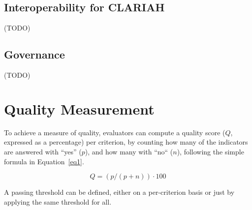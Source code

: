 \documentclass[a4paper,11pt]{article}
\begin{document}
\subsection{Interoperability for CLARIAH}

(TODO)

\subsection{Governance}

(TODO)

\section{Quality Measurement}

To achieve a measure of quality, evaluators can compute a quality score ($Q$,
expressed as a percentage) per criterion, by counting how many of the
indicators are answered with ``yes'' ($p$), and how many with ``no`` ($n$),
following the simple formula in Equation~\ref{eq1}.

\begin{equation}
\label{eq1}
Q = (p / (p + n)) \cdot 100
\end{equation}

A passing threshold can be defined, either on a per-criterion basis or just
by applying the same threshold for all. 
\end{document}
